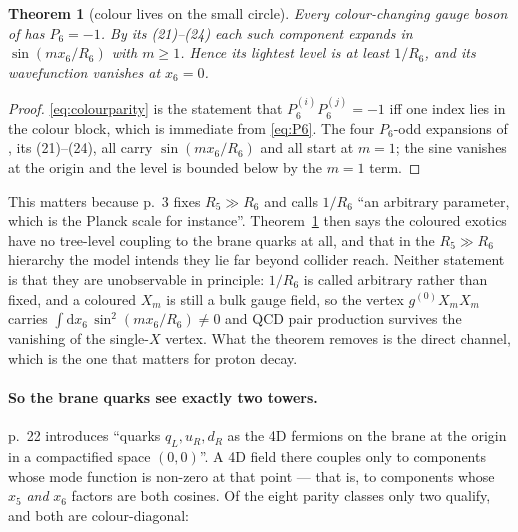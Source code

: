 \documentclass[11pt,a4paper]{article}
\newtheorem{theorem}{Theorem}
\begin{document}
\begin{theorem}[colour lives on the small circle]\label{thm:colourparity}
Every colour-changing gauge boson of \cite{KM25} has $P_6=-1$. By its (21)--(24) each such
component expands in $\sin(m x_6/R_6)$ with $m\ge1$. Hence its lightest level is at least $1/R_6$,
and its wavefunction \emph{vanishes} at $x_6=0$.
\end{theorem}
\begin{proof}
\eqref{eq:colourparity} is the statement that $P_6^{(i)}P_6^{(j)}=-1$ iff one index lies in the
colour block, which is immediate from \eqref{eq:P6}. The four $P_6$-odd expansions of \cite{KM25},
its (21)--(24), all carry $\sin(m x_6/R_6)$ and all start at $m=1$; the sine vanishes at the
origin and the level is bounded below by the $m=1$ term.
\end{proof}

\noindent This matters because \cite{KM25} p.~3 fixes $R_5\gg R_6$ and calls $1/R_6$ ``an
arbitrary parameter, which is the Planck scale for instance''. Theorem~\ref{thm:colourparity} then
says the coloured exotics have no tree-level coupling to the brane quarks at all, and that in the
$R_5\gg R_6$ hierarchy the model intends they lie far beyond collider reach. Neither statement is
that they are unobservable in principle: $1/R_6$ is called arbitrary rather than fixed, and a
coloured $X_m$ is still a bulk gauge field, so the vertex $g^{(0)}X_mX_m$ carries
$\int\!\mathrm{d}x_6\,\sin^2(mx_6/R_6)\neq0$ and QCD pair production survives the vanishing of the
single-$X$ vertex. What the theorem removes is the direct channel, which is the one that matters
for proton decay.

\paragraph{So the brane quarks see exactly two towers.} \cite{KM25} p.~22 introduces ``quarks
$q_L,u_R,d_R$ as the 4D fermions on the brane at the origin in a compactified space $(0,0)$''. A
4D field there couples only to components whose mode function is non-zero at that point --- that
is, to components whose $x_5$ \emph{and} $x_6$ factors are both cosines. Of the eight parity
classes only two qualify, and both are colour-diagonal:
\end{document}
